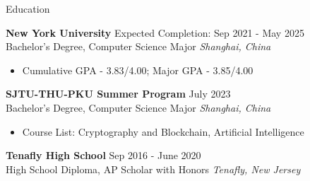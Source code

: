 \documentclass{cv} %
\begin{document}

\begin{rSection}{Education}

	\textbf{New York University} \hfill Expected Completion: Sep 2021 - May 2025\\
	Bachelor's Degree, Computer Science Major \hfill \textit{Shanghai, China}
	\begin{itemize}
		\item Cumulative GPA - 3.83/4.00; Major GPA - 3.85/4.00
	\end{itemize}

	\textbf{SJTU-THU-PKU Summer Program} \hfill July 2023\\
	Bachelor's Degree, Computer Science Major \hfill \textit{Shanghai, China}
	\begin{itemize}
		\item Course List: Cryptography and Blockchain, Artificial Intelligence
	\end{itemize}

	\textbf{Tenafly High School} \hfill Sep 2016 - June 2020\\
	High School Diploma, AP Scholar with Honors \hfill \textit{Tenafly, New Jersey}

\end{rSection}

\end{document}
